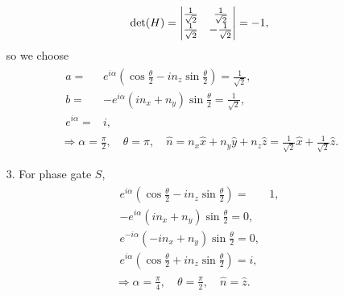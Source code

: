 \documentclass[en]{sol-man}
\begin{document}
\begin{sol}
\begin{itemize}
        \begin{align}
            \det(H)=\left\lvert\begin{matrix}
                \frac{1}{\sqrt{2}}&\frac{1}{\sqrt{2}}\\
                \frac{1}{\sqrt{2}}&-\frac{1}{\sqrt{2}}
            \end{matrix}\right\rvert=-1,
        \end{align}
        so we choose
        \begin{gather}
            \begin{align}
                a=&e^{i\alpha}\left(\cos\frac{\theta}{2}-in_z\sin\frac{\theta}{2}\right)=\frac{1}{\sqrt{2}},\\
                b=&-e^{i\alpha}(in_x+n_y)\sin\frac{\theta}{2}=\frac{1}{\sqrt{2}},\\
                e^{i\alpha}=&i,
            \end{align}\\
            \Longrightarrow\alpha=\frac{\pi}{2},\quad\theta=\pi,\quad\hat{n}=n_x\hat{x}+n_y\hat{y}+n_z\hat{z}=\frac{1}{\sqrt{2}}\hat{x}+\frac{1}{\sqrt{2}}\hat{z}.
        \end{gather}
        \item[3.] For phase gate $S$,
        \begin{gather}
            \begin{align}
                e^{i\alpha}\left(\cos\frac{\theta}{2}-in_z\sin\frac{\theta}{2}\right)=&1,\\
                -e^{i\alpha}\left(in_x+n_y\right)\sin\frac{\theta}{2}=0,\\
                e^{-i\alpha}(-in_x+n_y)\sin\frac{\theta}{2}=0,\\
                e^{i\alpha}\left(\cos\frac{\theta}{2}+in_z\sin\frac{\theta}{2}\right)=i,
            \end{align}\\
            \Longrightarrow\alpha=\frac{\pi}{4},\quad\theta=\frac{\pi}{2},\quad\hat{n}=\hat{z}.
        \end{gather}
    \end{itemize}
\end{sol}
\end{document}
